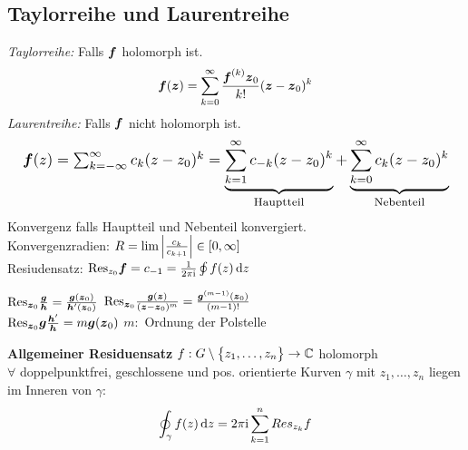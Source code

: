 \documentclass[german,color,5pt]{latex4ei/latex4ei_fs}
\begin{document}
\begin{sectionbox}
	\subsection{Taylorreihe und Laurentreihe}
	\emph{Taylorreihe:} Falls $\boldsymbol{f}$ holomorph ist.
	\begin{equation*}
		\boldsymbol{f}(\boldsymbol{z}) = \sum\limits_{k = 0}^{\infty} \frac{\boldsymbol{f}^{(k)} \boldsymbol{z}_0}{k!} (\boldsymbol{z} - \boldsymbol{z}_0)^k
	\end{equation*}
	\emph{Laurentreihe:} Falls $\boldsymbol{f}$ nicht holomorph ist.
	\begin{equation*}
		\resizebox{\textwidth}{!}{
			$\cx f(z)=\sum_{k=- \infty}^{\infty} c_k (z-z_0)^{k} = \underbrace{\sum_{k=1}^{\infty} c_{-k} (z-z_0)^{k}}_{\text{Hauptteil}} + \underbrace{\sum_{k=0}^{\infty} c_k (z-z_0)^{k}}_{\text{Nebenteil}}$
		}
	\end{equation*} 
	Konvergenz falls Hauptteil und Nebenteil konvergiert. \\ 
	Konvergenzradien: $R = \lim \left\vert\frac{c_k}{c_{k+1}}\right\vert \in [0, \infty]$ \\ 
	Resiudensatz: $\mathrm{Res}_{z_0} \cx f = c_{-1} = \frac{1}{2\pi\i} \oint f(z) \diff z$
	
	\begin{emphbox}
		\raggedright
		$\mathrm{Res}_{\boldsymbol{z}_0} \frac{\boldsymbol{g}}{\boldsymbol{h}} = \frac{\boldsymbol{g}(\boldsymbol{z}_0)}{\boldsymbol{h}'(\boldsymbol{z}_0)}$ \qquad $\mathrm{Res}_{\boldsymbol{z}_0} \frac{\boldsymbol{g}(\boldsymbol{z})}{(\boldsymbol{z} - \boldsymbol{z}_0)^m} = \frac{\boldsymbol{g}^{(m-1)}(\boldsymbol{z}_0)}{(m-1)!}$\\
		$\mathrm{Res}_{\boldsymbol{z}_0} \boldsymbol{g} \frac{\boldsymbol{h}'}{\boldsymbol{h}} = m \boldsymbol{g}(\boldsymbol{z}_0)$ \qquad $m:$ Ordnung der Polstelle
	\end{emphbox}
	\textbf{Allgemeiner Residuensatz} $f:G \setminus \bigl\{z_1, \ldots, z_n\bigr\} \rightarrow \mathbb C$ holomorph \\ 
	$\forall $ doppelpunktfrei, geschlossene und pos. orientierte Kurven $\gamma$ mit $z_1, \dots, z_n$ liegen im Inneren von $\gamma$:
	\begin{equation*}
		\oint_\gamma f(z) \diff z = 2 \pi \i \sum_{k=1}^{n} Res_{z_k} f
	\end{equation*}
\end{sectionbox}
\end{document}
